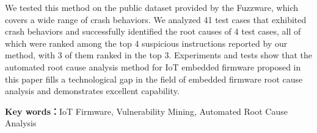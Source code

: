 We tested this method on the public dataset provided by the Fuzzware, which covers a wide range of crash behaviors. We analyzed 41 test cases that exhibited crash behaviors and successfully identified the root causes of 4 test cases, all of which were ranked among the top 4 suspicious instructions reported by our method, with 3 of them ranked in the top 3. Experiments and tests show that the automated root cause analysis method for IoT embedded firmware proposed in this paper fills a technological gap in the field of embedded firmware root cause analysis and demonstrates excellent capability.

\textbf{Key words：}IoT Firmware, Vulnerability Mining, Automated Root Cause Analysis
